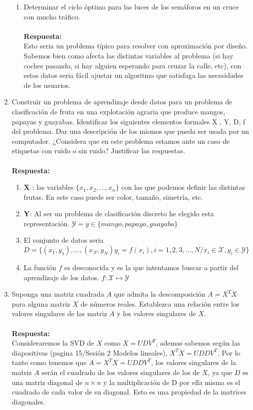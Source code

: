 \documentclass[12pt,a4paper]{article}
\begin{document}
\begin{enumerate}
\begin{enumerate}
		\item Determinar el ciclo óptimo para las luces de los semáforos en un cruce con mucho tráfico.\\\\		\textbf{Respuesta:}\\
		Esto seria un problema típico para resolver con aproximación por diseño. Sabemos bien como afecta las distintas variables al problema (si hay coches pasando, si  hay alguien esperando para cruzar la calle, etc), con estos datos seria fácil ajustar un algoritmo que satisfaga las necesidades de los usuarios.
	\end{enumerate}
	\item Construir un problema de aprendizaje desde datos para un problema de clasificación de fruta en una explotación agraria que produce mangos, papayas y guayabas. Identificar los siguientes elementos formales X , Y, D, f del problema. Dar una descripción de los mismos que pueda ser usada por un computador. ¿Considera que en este problema estamos ante un caso de etiquetas con ruido o sin ruido? Justificar las respuestas.\\\\
		\textbf{Respuesta:}\\
		\begin{enumerate}
			\item \textbf{X} : las variables $\{x_1,x_2,...,x_n\}$ con las que podemos definir las distintas frutas. En este caso puede ser color, tamaño, simetría, etc. 
			\item \textbf{Y}: Al ser un problema de clasificación discreto he elegido esta representación. $\mathcal{Y} = y \in \{mango, papaya, guayaba\}$
			\item El conjunto de datos seria $D = \{(x_1,y_1),...,(x_N, y_N) y_i=f(x_i),i=1,2,3,...,N/x_i \in \mathcal{X},y_i \in \mathcal{Y}\} $ 
			\item La función $f$ es desconocida y es la que intentamos buscar a partir del aprendizaje de los datos. $f : \mathcal{X} \mapsto \mathcal{Y}$
		\end{enumerate}
	\item Suponga una matriz cuadrada $A$ que admita la descomposición $A = X^TX$ para alguna matriz $X$ de números reales. Establezca una relación entre los valores singulares de las matriz $A$ y los valores singulares de $X$.\\\\\textbf{Respuesta: }\\
	Consideraremos la SVD de $X$ como $X=UDV^T$, ademas sabemos según las diapositivas (pagina 15/Sesión 2 Modelos lineales), $X^TX = UDDV^T$. Por lo tanto como tenemos que $A=X^TX = UDDV^T$, los valores singulares de la matriz $A$ serán el cuadrado de los valores singulares de los de $X$, ya que $D$ es una matriz diagonal de $n \times n$ y la multiplicación de D por ella misma es el cuadrado de cada valor de su diagonal. Esto es una propiedad de la matrices diagonales.

\end{enumerate}
\end{document}
